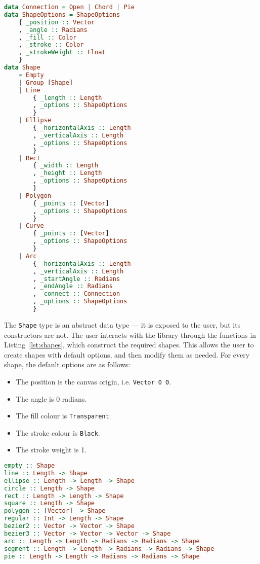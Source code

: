 \documentclass[../main.tex]{subfiles}
\begin{document}
                \begin{lstlisting}[language={Haskell}, label={lst:shape}, caption={The \texttt{Shape} 
                    type definition.}]
data Connection = Open | Chord | Pie
data ShapeOptions = ShapeOptions
    { _position :: Vector
    , _angle :: Radians
    , _fill :: Color
    , _stroke :: Color
    , _strokeWeight :: Float
    }
data Shape
    = Empty
    | Group [Shape]
    | Line
        { _length :: Length
        , _options :: ShapeOptions
        }
    | Ellipse
        { _horizontalAxis :: Length
        , _verticalAxis :: Length
        , _options :: ShapeOptions
        }
    | Rect
        { _width :: Length
        , _height :: Length
        , _options :: ShapeOptions
        }
    | Polygon
        { _points :: [Vector]
        , _options :: ShapeOptions
        }
    | Curve
        { _points :: [Vector]
        , _options :: ShapeOptions
        }
    | Arc
        { _horizontalAxis :: Length
        , _verticalAxis :: Length
        , _startAngle :: Radians
        , _endAngle :: Radians
        , _connect :: Connection
        , _options :: ShapeOptions
        }\end{lstlisting}

                The \texttt{Shape} type is an abstract data type — it is exposed to the user,
                    but its constructors are not.
                The user interacts with the library through the functions in
                    Listing~\ref{lst:shapes}, which construct the required shapes.
                This allows the user to create shapes with default options, and then modify
                    them as needed.
                For every shape, the default options are as follows:
                \begin{itemize}
                    \item The position is the canvas origin, i.e. \texttt{Vector 0 0}.
                    \item The angle is 0 radians.
                    \item The fill colour is \texttt{Transparent}.
                    \item The stroke colour is \texttt{Black}.
                    \item The stroke weight is 1.
                \end{itemize}

                \begin{lstlisting}[language={Haskell}, label={lst:shapes}, caption={The functions to 
                    create shapes.}]
empty :: Shape
line :: Length -> Shape
ellipse :: Length -> Length -> Shape
circle :: Length -> Shape
rect :: Length -> Length -> Shape
square :: Length -> Shape
polygon :: [Vector] -> Shape
regular :: Int -> Length -> Shape
bezier2 :: Vector -> Vector -> Shape
bezier3 :: Vector -> Vector -> Vector -> Shape
arc :: Length -> Length -> Radians -> Radians -> Shape
segment :: Length -> Length -> Radians -> Radians -> Shape
pie :: Length -> Length -> Radians -> Radians -> Shape\end{lstlisting}
\end{document}
